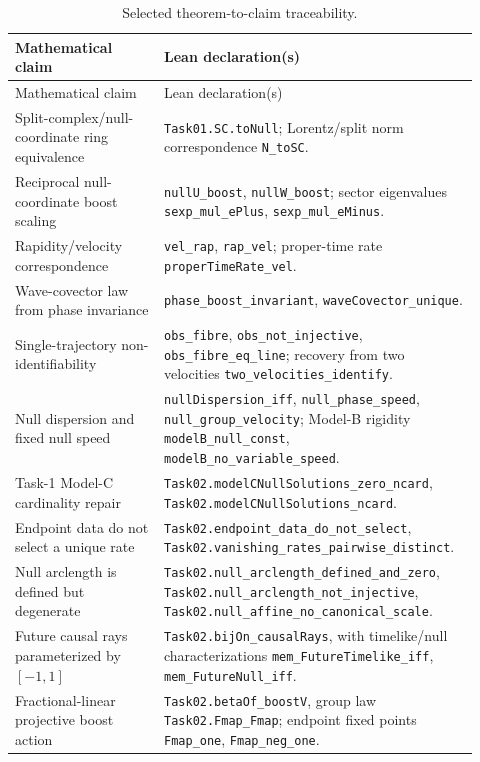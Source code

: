 \documentclass[11pt,a4paper]{article}
\begin{document}
\begin{longtable}{>{\raggedright\arraybackslash}p{0.31\linewidth} >{\raggedright\arraybackslash}p{0.61\linewidth}}
\caption{Selected theorem-to-claim traceability.}\label{tab:leantrace}\\
\toprule
Mathematical claim & Lean declaration(s) \\
\midrule
\endfirsthead
\toprule
Mathematical claim & Lean declaration(s) \\
\midrule
\endhead
Split-complex/null-coordinate ring equivalence & \texttt{Task01.SC.toNull}; Lorentz/split norm correspondence \texttt{N\_toSC}.\\
Reciprocal null-coordinate boost scaling & \texttt{nullU\_boost}, \texttt{nullW\_boost}; sector eigenvalues \texttt{sexp\_mul\_ePlus}, \texttt{sexp\_mul\_eMinus}.\\
Rapidity/velocity correspondence & \texttt{vel\_rap}, \texttt{rap\_vel}; proper-time rate \texttt{properTimeRate\_vel}.\\
Wave-covector law from phase invariance & \texttt{phase\_boost\_invariant}, \texttt{waveCovector\_unique}.\\
Single-trajectory non-identifiability & \texttt{obs\_fibre}, \texttt{obs\_not\_injective}, \texttt{obs\_fibre\_eq\_line}; recovery from two velocities \texttt{two\_velocities\_identify}.\\
Null dispersion and fixed null speed & \texttt{nullDispersion\_iff}, \texttt{null\_phase\_speed}, \texttt{null\_group\_velocity}; Model-B rigidity \texttt{modelB\_null\_const}, \texttt{modelB\_no\_variable\_speed}.\\
Task-1 Model-C cardinality repair & \texttt{Task02.modelCNullSolutions\_zero\_ncard}, \texttt{Task02.modelCNullSolutions\_ncard}.\\
Endpoint data do not select a unique rate & \texttt{Task02.endpoint\_data\_do\_not\_select}, \texttt{Task02.vanishing\_rates\_pairwise\_distinct}.\\
Null arclength is defined but degenerate & \texttt{Task02.null\_arclength\_defined\_and\_zero}, \texttt{Task02.null\_arclength\_not\_injective}, \texttt{Task02.null\_affine\_no\_canonical\_scale}.\\
Future causal rays parameterized by $[-1,1]$ & \texttt{Task02.bijOn\_causalRays}, with timelike/null characterizations \texttt{mem\_FutureTimelike\_iff}, \texttt{mem\_FutureNull\_iff}.\\
Fractional-linear projective boost action & \texttt{Task02.betaOf\_boostV}, group law \texttt{Task02.Fmap\_Fmap}; endpoint fixed points \texttt{Fmap\_one}, \texttt{Fmap\_neg\_one}.\\

\end{longtable}
\end{document}
